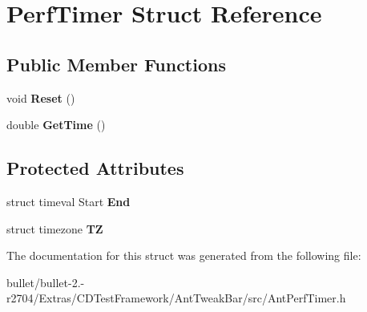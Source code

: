 \hypertarget{struct_perf_timer}{\section{Perf\+Timer Struct Reference}
\label{struct_perf_timer}
}
\subsection*{Public Member Functions}
\begin{DoxyCompactItemize}
\item 
\hypertarget{struct_perf_timer_a4296e5dddca29351b02c6a55ed82ece8}{void {\bfseries Reset} ()}\label{struct_perf_timer_a4296e5dddca29351b02c6a55ed82ece8}

\item 
\hypertarget{struct_perf_timer_a1223247c689efd67012b7ab78550ccf7}{double {\bfseries Get\+Time} ()}\label{struct_perf_timer_a1223247c689efd67012b7ab78550ccf7}

\end{DoxyCompactItemize}
\subsection*{Protected Attributes}
\begin{DoxyCompactItemize}
\item 
\hypertarget{struct_perf_timer_a45808ecdd765e4033137e6093e755a3e}{struct timeval Start {\bfseries End}}\label{struct_perf_timer_a45808ecdd765e4033137e6093e755a3e}

\item 
\hypertarget{struct_perf_timer_a6d0b446c46be4e531cbb56edd6363a08}{struct timezone {\bfseries T\+Z}}\label{struct_perf_timer_a6d0b446c46be4e531cbb56edd6363a08}

\end{DoxyCompactItemize}


The documentation for this struct was generated from the following file\+:\begin{DoxyCompactItemize}
\item 
bullet/bullet-\/2.-\/r2704/\+Extras/\+C\+D\+Test\+Framework/\+Ant\+Tweak\+Bar/src/Ant\+Perf\+Timer.\+h\end{DoxyCompactItemize}
